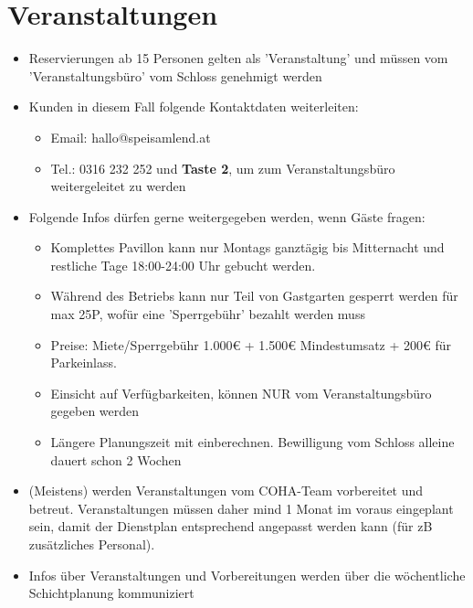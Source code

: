 \documentclass[a4paper,12pt]{article}
\begin{document}
\section{Veranstaltungen}\label{sec:veranstaltung}
\begin{itemize}[topsep=0pt, itemsep=1pt, leftmargin=1em]
    \item[-] Reservierungen ab 15 Personen gelten als 'Veranstaltung' und müssen vom 'Veranstaltungsbüro' vom Schloss genehmigt werden
    \item[-] Kunden in diesem Fall folgende Kontaktdaten weiterleiten:
    \begin{itemize}[topsep=0pt, itemsep=1pt]
        \item[] Email: hallo@speisamlend.at
        \item[] Tel.: 0316 232 252 und \textbf{Taste 2}, um zum Veranstaltungsbüro weitergeleitet zu werden
    \end{itemize}
    \item[-] Folgende Infos dürfen gerne weitergegeben werden, wenn Gäste fragen:
    \begin{itemize}
        \item[] Komplettes Pavillon kann nur Montags ganztägig bis Mitternacht und restliche Tage 18:00-24:00 Uhr gebucht werden. 
        \item[] Während des Betriebs kann nur Teil von Gastgarten gesperrt werden für max 25P, wofür eine 'Sperrgebühr' bezahlt werden muss
        \item[] Preise: Miete/Sperrgebühr 1.000€ + 1.500€ Mindestumsatz + 200€ für Parkeinlass.
        \item[] Einsicht auf Verfügbarkeiten, können NUR vom Veranstaltungsbüro gegeben werden
        \item[] Längere Planungszeit mit einberechnen. Bewilligung vom Schloss alleine dauert schon 2 Wochen
    \end{itemize}
    \item[-] (Meistens) werden Veranstaltungen vom COHA-Team vorbereitet und betreut. Veranstaltungen müssen daher mind 1 Monat im voraus eingeplant sein, damit der Dienstplan entsprechend angepasst werden kann (für zB zusätzliches Personal).
    \item[-] Infos über Veranstaltungen und Vorbereitungen werden über die wöchentliche Schichtplanung kommuniziert 
\end{itemize}


\end{document}
